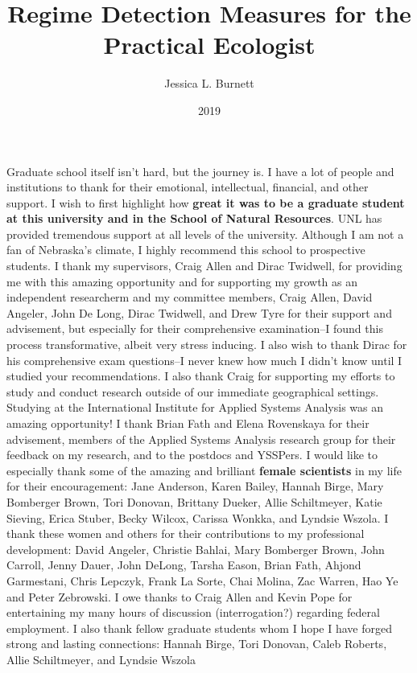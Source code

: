 \documentclass[12pt,twoside,openany]{reedthesis}
\title{Regime Detection Measures for the Practical Ecologist}
\author{Jessica L. Burnett}
\date{2019}
\begin{document}
  \maketitle

\frontmatter %
\pagestyle{empty} %
  \begin{acknowledgements}
    Graduate school itself isn't hard, but the journey is. I have a lot of people and institutions to thank for their emotional, intellectual, financial, and other support. I wish to first highlight how \textbf{great it was to be a graduate student at this university and in the School of Natural Resources}. UNL has provided tremendous support at all levels of the university. Although I am not a fan of Nebraska's climate, I highly recommend this school to prospective students.
    I thank my supervisors, Craig Allen and Dirac Twidwell, for providing me with this amazing opportunity and for supporting my growth as an independent researcherm and my committee members, Craig Allen, David Angeler, John De Long, Dirac Twidwell, and Drew Tyre for their support and advisement, but especially for their comprehensive examination--I found this process transformative, albeit very stress inducing. I also wish to thank Dirac for his comprehensive exam questions--I never knew how much I didn't know until I studied your recommendations. I also thank Craig for supporting my efforts to study and conduct research outside of our immediate geographical settings. Studying at the International Institute for Applied Systems Analysis was an amazing opportunity! I thank Brian Fath and Elena Rovenskaya for their advisement, members of the Applied Systems Analysis research group for their feedback on my research, and to the postdocs and YSSPers.
    I would like to especially thank some of the amazing and brilliant \textbf{female scientists} in my life for their encouragement: Jane Anderson, Karen Bailey, Hannah Birge, Mary Bomberger Brown, Tori Donovan, Brittany Dueker, Allie Schiltmeyer, Katie Sieving, Erica Stuber, Becky Wilcox, Carissa Wonkka, and Lyndsie Wszola. I thank these women and others for their contributions to my professional development: David Angeler, Christie Bahlai, Mary Bomberger Brown, John Carroll, Jenny Dauer, John DeLong, Tarsha Eason, Brian Fath, Ahjond Garmestani, Chris Lepczyk, Frank La Sorte, Chai Molina, Zac Warren, Hao Ye and Peter Zebrowski. I owe thanks to Craig Allen and Kevin Pope for entertaining my many hours of discussion (interrogation?) regarding federal employment. I also thank fellow graduate students whom I hope I have forged strong and lasting connections: Hannah Birge, Tori Donovan, Caleb Roberts, Allie Schiltmeyer, and Lyndsie Wszola

\end{acknowledgements}
\end{document}

